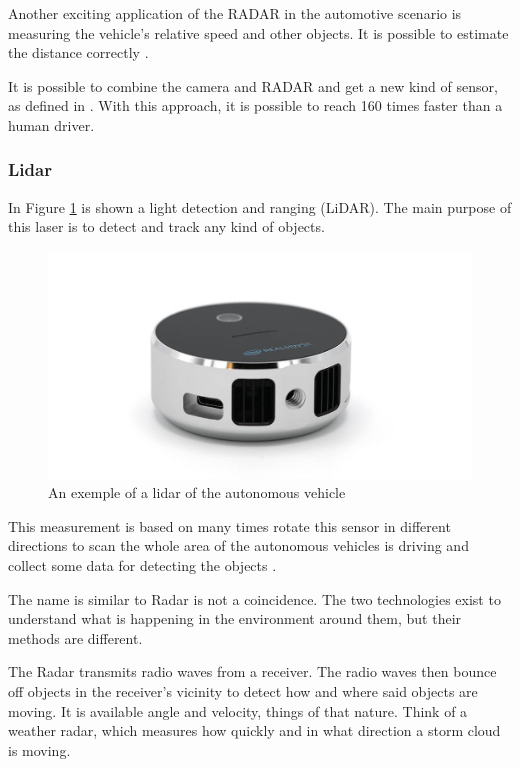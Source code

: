 Another exciting application of the RADAR in the automotive scenario is measuring the vehicle's relative speed and other objects. It is possible to estimate the distance correctly  \cite{stevenson2011long}.

It is possible to combine the camera and RADAR and get a new kind of sensor, as defined in \cite{kamerad}. With this approach, it is possible to reach 160 times faster than a human driver.

\subsubsection{Lidar}\label{sub:lidar}
In Figure \ref{fig:lidar} is shown a light detection and ranging (LiDAR). The main purpose of this laser is to detect and track any kind of objects. 
\begin{figure}[H]
\centering
\includegraphics[scale=0.25]{imagens/lidar.jpg}
\caption{An exemple of a lidar of the autonomous vehicle}
\label{fig:lidar}
\end{figure}

This measurement is based on many times rotate this sensor in different directions to scan the whole area of the autonomous vehicles is driving and collect some data for detecting the objects \cite{gao2018object}.

The name is similar to Radar is not a coincidence. The two technologies exist to understand what is happening in the environment around them, but their methods are different.

The Radar transmits radio waves from a receiver. The radio waves then bounce off objects in the receiver's vicinity to detect how and where said objects are moving. It is available angle and velocity, things of that nature. Think of a weather radar, which measures how quickly and in what direction a storm cloud is moving. 

